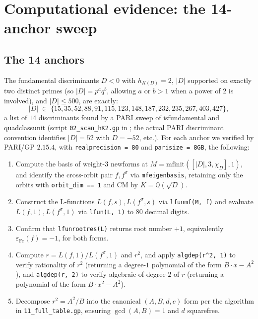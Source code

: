 \documentclass[11pt]{amsart}
\theoremstyle{definition}
\theoremstyle{remark}
\newcommand{\Q}{\mathbb{Q}}
\newcommand{\chiD}{\chi_D}
\begin{document}
\section{Computational evidence: the 14-anchor sweep}\label{sec:evidence}

\subsection{The 14 anchors}\label{ssec:14-anchors}

The fundamental discriminants \(D < 0\) with \(h_{K(D)} = 2\),
\(|D|\) supported on exactly two distinct primes
(so \(|D| = p^{a} q^{b}\), allowing \(a\) or \(b > 1\) when a power
of \(2\) is involved), and \(|D| \le 500\), are exactly:
\[
   |D| \;\in\; \{15, 35, 52, 88, 91, 115, 123, 148, 187, 232, 235,
                  267, 403, 427\} ,
\]
a list of \(14\) discriminants found by a PARI sweep of
\textsf{isfundamental} and \textsf{quadclassunit} (script
\verb|02_scan_hK2.gp| in ; the actual PARI
discriminant convention identifies \(|D| = 52\) with
\(D = -52\), etc.). For each anchor we
verified by PARI/GP \(2.15.4\), with \verb|realprecision = 80| and
\verb|parisize = 8GB|, the following:
\begin{enumerate}
\item[(S1)] Compute the basis of weight-\(3\) newforms at
  \(M = \mathrm{mfinit}([|D|, 3, \chiD], 1)\), and identify the
  cross-orbit pair \(f, f^{\sigma}\) via \verb|mfeigenbasis|,
  retaining only the orbits with \verb|orbit_dim == 1| and CM by
  \(K = \Q(\sqrt{D})\).
\item[(S2)] Construct the L-functions \(L(f, s), L(f^{\sigma}, s)\)
  via \verb|lfunmf(M, f)| and evaluate
  \(L(f, 1), L(f^{\sigma}, 1)\) via \verb|lfun(L, 1)| to \(80\)
  decimal digits.
\item[(S3)] Confirm that \verb|lfunrootres(L)| returns root number
  \(+1\), equivalently \(\varepsilon_{\mathrm{Fr}}(f) = -1\), for
  both forms.
\item[(S4)] Compute \(r = L(f, 1)/L(f^{\sigma}, 1)\) and
  \(r^{2}\), and apply \verb|algdep(r^2, 1)| to verify rationality
  of \(r^{2}\) (returning a degree-\(1\) polynomial of the form
  \(B \cdot x - A^{2}\)), and \verb|algdep(r, 2)| to verify
  algebraic-of-degree-\(2\) of \(r\) (returning a polynomial of the
  form \(B \cdot x^{2} - A^{2}\)).
\item[(S5)] Decompose \(r^{2} = A^{2}/B\) into the canonical
  \((A, B, d, e)\) form per the algorithm in
  \verb|11_full_table.gp|, ensuring \(\gcd(A, B) = 1\) and \(d\)
  squarefree.
\end{enumerate}
\end{document}
